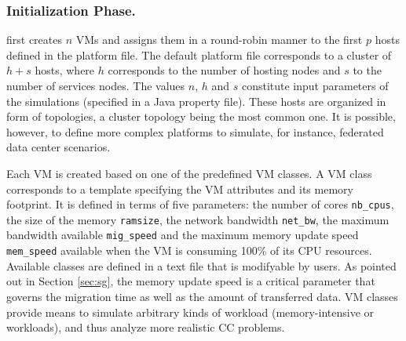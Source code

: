 \subsubsection{Initialization Phase.}
\vmps first creates $n$ VMs and assigns them in a round-robin manner
to the first $p$ hosts defined in the platform file.  The default
platform file corresponds to a cluster of $h+s$ hosts, where $h$
corresponds to the number of hosting nodes and $s$ to the number of
services nodes. The values $n$, $h$ and $s$ constitute input
parameters of the simulations (specified in a Java property file).
These hosts are organized in form of topologies, a cluster topology
being the most common one. It is possible, however, to define more
complex platforms to simulate, for instance, federated data center scenarios.

Each VM is created based on one of the predefined VM classes. A VM
class corresponds to a template specifying the VM attributes and its
memory footprint. It is
defined in terms of five parameters: the number of cores
\texttt{nb\_cpus}, the size of the memory \texttt{ramsize}, the
network bandwidth \texttt{net\_bw}, the maximum bandwidth available
\texttt{mig\_speed} and the maximum memory update speed
\texttt{mem\_speed} available when the VM is consuming 100\% of its
CPU resources.  Available classes are defined in a text file that is
modifyable by users.  As pointed out in Section \ref{sec:sg}, the
memory update speed is a critical parameter that governs the migration
time as well as the amount of transferred data.  VM classes provide
means to simulate arbitrary kinds of workload (\eg memory-intensive or
workloads), and thus analyze more realistic CC problems.


